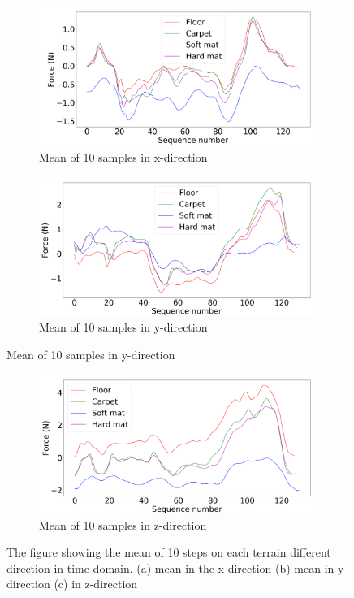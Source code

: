 \documentclass[USenglish]{ifimaster}  %
\begin{document}
\begin{figure} [h]
	\centering
	\begin{subfigure}[b]{0.95\textwidth}
		\includegraphics[width=\textwidth,height=\textheight,keepaspectratio]{Figures/x}
		\caption{Mean of 10 samples in x-direction}
		\label{fig:meanx} 
	\end{subfigure}
	
	\begin{subfigure}[b]{0.95\textwidth}
		\includegraphics[width=\textwidth,height=\textheight,keepaspectratio]{Figures/y}
		\caption{Mean of 10 samples in y-direction}
		\label{fig:meany}
	\end{subfigure}
\end{figure}
\begin{figure}[h] \ContinuedFloat
	\begin{subfigure}[b]{0.95\textwidth}
		\includegraphics[width=\textwidth,height=\textheight,keepaspectratio]{Figures/z}
		\caption{Mean of 10 samples in z-direction}
		\label{fig:meanz}
	\end{subfigure}
	
	\caption[]{The figure showing the mean of 10 steps on each terrain different direction in time domain. (a) mean in the x-direction (b) mean in y-direction (c) in z-direction }
	\label{fig:meanxyz}
\end{figure}
\end{document}

